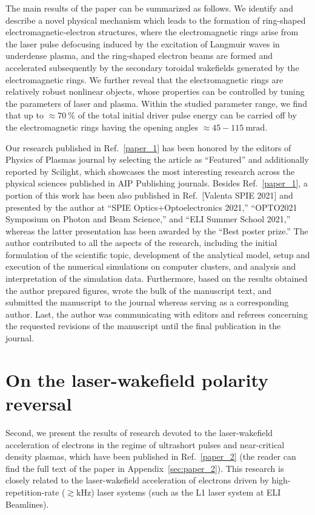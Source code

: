 \documentclass[10pt, a4paper, twoside, openright]{report}
\newcommand{\q}[1]{``#1''} %
\begin{document}
The main results of the paper can be summarized as follows. We identify and describe a novel physical mechanism which leads to the formation of ring-shaped electromagnetic-electron structures, where the electromagnetic rings arise from the laser pulse defocusing induced by the excitation of Langmuir waves in underdense plasma, and the ring-shaped electron beams are formed and accelerated subsequently by the secondary toroidal wakefields generated by the electromagnetic rings. We further reveal that the electromagnetic rings are relatively robust nonlinear objects, whose properties can be controlled by tuning the parameters of laser and plasma. Within the studied parameter range, we find that up to $ \approx 70 \ \% $ of the total initial driver pulse energy can be carried off by the electromagnetic rings having the opening angles $ \approx 45 - 115 \ \mathrm{mrad} $. 

Our research published in Ref.~\ref{paper_1} has been honored by the editors of Physics of Plasmas journal by selecting the article as \q{Featured} and additionally reported by Scilight, which showcases the most interesting research across the physical sciences published in AIP Publishing journals. Besides Ref.~\ref{paper_1}, a portion of this work has been also published in Ref.~[Valenta SPIE 2021] and presented by the author at \q{SPIE Optics+Optoelectronics 2021,} \q{OPTO2021 Symposium on Photon and Beam Science,} and \q{ELI Summer School 2021,} whereas the latter presentation has been awarded by the \q{Best poster prize.} The author contributed to all the aspects of the research, including the initial formulation of the scientific topic, development of the analytical model, setup and execution of the numerical simulations on computer clusters, and analysis and interpretation of the simulation data. Furthermore, based on the results obtained the author prepared figures, wrote the bulk of the manuscript text, and submitted the manuscript to the journal whereas serving as a corresponding author. Last, the author was communicating with editors and referees concerning the requested revisions of the manuscript until the final publication in the journal.

\section{On the laser-wakefield polarity reversal\label{sec:on_the_laser-wakefield_polarity_reversal}}
%

Second, we present the results of research devoted to the laser-wakefield acceleration of electrons in the regime of ultrashort pulses and near-critical density plasmas, which have been published in Ref.~\ref{paper_2} (the reader can find the full text of the paper in Appendix~\ref{sec:paper_2}). This research is closely related to the laser-wakefield acceleration of electrons driven by high-repetition-rate ($ \gtrsim \mathrm{kHz} $) laser systems (such as the L1 laser system at ELI Beamlines). 
\end{document}

